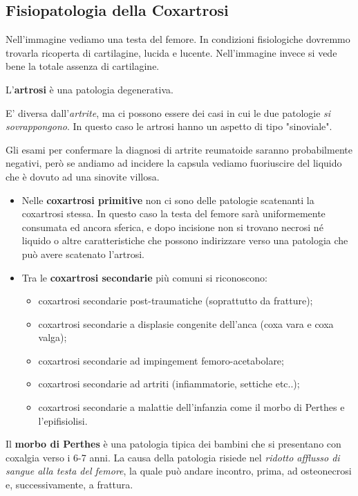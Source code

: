 \subsection{Fisiopatologia della Coxartrosi}

Nell'immagine vediamo una testa del femore. In condizioni fisiologiche dovremmo trovarla ricoperta di cartilagine, lucida e lucente.
Nell'immagine invece si vede bene la totale assenza di cartilagine.

L'\textbf{artrosi} è una patologia degenerativa.

E' diversa dall'\emph{artrite}, ma ci possono essere dei casi in cui le due patologie \emph{si sovrappongono}. In questo caso le artrosi hanno un aspetto di tipo "sinoviale".

Gli esami per confermare la diagnosi di artrite reumatoide saranno probabilmente negativi, però se andiamo ad incidere la capsula vediamo fuoriuscire del liquido che è dovuto ad una sinovite villosa.

\begin{itemize}
\item
  Nelle \textbf{coxartrosi primitive} non ci sono delle patologie scatenanti la coxartrosi stessa. In questo caso la testa del femore sarà uniformemente consumata ed ancora sferica, e dopo incisione non si trovano necrosi né liquido o altre caratteristiche che possono indirizzare verso una patologia che può avere scatenato l'artrosi.
\item
  Tra le \textbf{coxartrosi secondarie} più comuni si riconoscono:
\begin{itemize}
\item
  coxartrosi secondarie post-traumatiche (soprattutto da fratture);
\item
  coxartrosi secondarie a displasie congenite dell'anca (coxa vara e coxa valga);
\item
  coxartrosi secondarie ad impingement femoro-acetabolare;
\item
  coxartrosi secondarie ad artriti (infiammatorie, settiche etc..);
\item
  coxartrosi secondarie a malattie dell'infanzia come il morbo di Perthes e l'epifisiolisi.
\end{itemize}
\end{itemize}

Il \textbf{morbo di Perthes} è una patologia tipica dei bambini che si presentano con coxalgia verso i 6-7 anni. La causa della patologia risiede nel \emph{ridotto afflusso di sangue alla testa del femore}, la quale può andare incontro, prima, ad osteonecrosi e, successivamente, a frattura.

